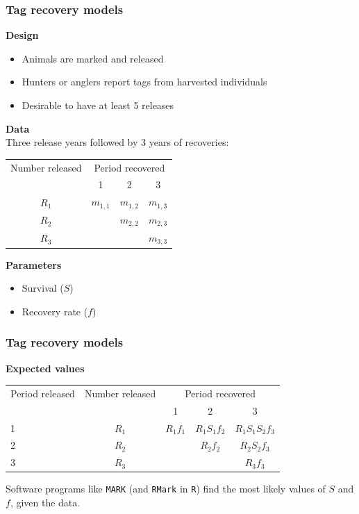 \documentclass[color=usenames,dvipsnames]{beamer}\usepackage[]{graphicx}\usepackage[]{xcolor}
\begin{document}
\begin{frame}
  \frametitle{Tag recovery models}
  {\bf Design}
  \begin{itemize} \small
    \item Animals are marked and released
    \item Hunters or anglers report tags from harvested individuals
    \item Desirable to have at least 5 releases
  \end{itemize}
  \pause
  \vfill
  {\bf Data}                                                 \\
  {\small Three release years followed by 3 years of recoveries:}
  \begin{center}
    \small
    \begin{tabular}{cccc}
      \hline
      Number released & \multicolumn{3}{c}{Period recovered} \\
      \cline{2-4}
                      & 1         & 2         & 3            \\
      \hline
      $R_1$           & $m_{1,1}$ & $m_{1,2}$ & $m_{1,3}$      \\
      $R_2$           &           & $m_{2,2}$ & $m_{2,3}$      \\
      $R_3$           &           &           & $m_{3,3}$      \\
      \hline
    \end{tabular}
  \end{center}
  \pause
  \vfill
  {\bf Parameters}                                           \\
  \begin{itemize} \small
    \item Survival ($S$)
    \item Recovery rate ($f$)
  \end{itemize}
\end{frame}


\begin{frame}
  \frametitle{Tag recovery models}
  {\bf Expected values}
  \begin{center}
    \begin{tabular}{lcccc}
      \hline
      Period released & Number released & \multicolumn{3}{c}{Period recovered} \\
      \cline{3-5}
                    &  & 1 & 2 & 3 \\
      \hline
      1 & $R_1$ & $R_1f_1$ & $R_1S_1f_2$ & $R_1S_1S_2f_3$ \\
      2 & $R_2$ &          & $R_2f_2$ & $R_2S_2f_3$ \\
      3 & $R_3$ &          &          & $R_3f_3$ \\
      \hline
    \end{tabular}
  \end{center}
  \pause
  \vfill
  \centering
  Software programs like {\tt MARK} (and {\tt RMark} in {\tt R}) find
  the most likely values of $S$ and $f$, given the data. \\
\end{frame}
\end{document}

